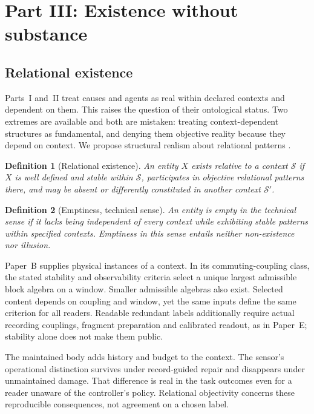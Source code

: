 \documentclass[11pt,a4paper]{article}
\newtheorem{definition}{Definition}[section]
\begin{document}
\section{Part III: Existence without substance}
\label{sec:existence}

\subsection{Relational existence}

Parts~I and~II treat causes and agents as real within declared contexts and dependent on them. This raises the question of their ontological status. Two extremes are available and both are mistaken: treating context-dependent structures as fundamental, and denying them objective reality because they depend on context. We propose structural realism about relational patterns \cite{Ladyman2007,French2014}.

\begin{definition}[Relational existence]
\label{def:relational}
An entity $X$ exists relative to a context $\mathcal S$ if $X$ is well defined and stable within $\mathcal S$, participates in objective relational patterns there, and may be absent or differently constituted in another context $\mathcal S'$.
\end{definition}

\begin{definition}[Emptiness, technical sense]
\label{def:empty}
An entity is empty in the technical sense if it lacks being independent of every context while exhibiting stable patterns within specified contexts. Emptiness in this sense entails neither non-existence nor illusion.
\end{definition}

Paper~B supplies physical instances of a context. In its commuting-coupling
class, the stated stability and observability criteria select a unique
largest admissible block algebra on a window. Smaller admissible algebras
also exist. Selected content depends on coupling and window, yet the
same inputs define the same criterion for all readers. Readable redundant
labels additionally require actual recording couplings, fragment preparation
and calibrated readout, as in Paper~E; stability alone does not make them
public.

The maintained body adds history and budget to the context.
The sensor's operational distinction survives under record-guided repair
and disappears under unmaintained damage. That difference is real in the
task outcomes even for a reader unaware of the controller's policy.
Relational objectivity concerns these reproducible consequences, not
agreement on a chosen label.
\end{document}

